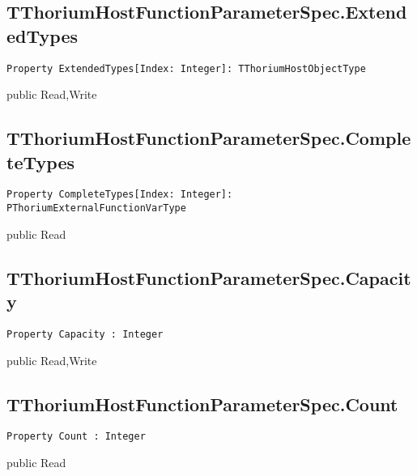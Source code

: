 \subsection{TThoriumHostFunctionParameterSpec.ExtendedTypes}
\label{thoriumcore:thorium:tthoriumhostfunctionparameterspec:extendedtypes}
\begin{FPCList}
\Synopsis
\Declaration 

\begin{verbatim}
Property ExtendedTypes[Index: Integer]: TThoriumHostObjectType
\end{verbatim}
\Visibility
public
\Access
Read,Write
\Description
\end{FPCList}
\subsection{TThoriumHostFunctionParameterSpec.CompleteTypes}
\label{thoriumcore:thorium:tthoriumhostfunctionparameterspec:completetypes}
\begin{FPCList}
\Synopsis
\Declaration 

\begin{verbatim}
Property CompleteTypes[Index: Integer]: PThoriumExternalFunctionVarType
\end{verbatim}
\Visibility
public
\Access
Read
\Description
\end{FPCList}
\subsection{TThoriumHostFunctionParameterSpec.Capacity}
\label{thoriumcore:thorium:tthoriumhostfunctionparameterspec:capacity}
\begin{FPCList}
\Synopsis
\Declaration 

\begin{verbatim}
Property Capacity : Integer
\end{verbatim}
\Visibility
public
\Access
Read,Write
\Description
\end{FPCList}
\subsection{TThoriumHostFunctionParameterSpec.Count}
\label{thoriumcore:thorium:tthoriumhostfunctionparameterspec:count}
\begin{FPCList}
\Synopsis
\Declaration 

\begin{verbatim}
Property Count : Integer
\end{verbatim}
\Visibility
public
\Access
Read
\Description
\end{FPCList}
